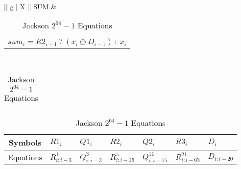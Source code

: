 \begin{table}[H]
\begin{tabularx}{\textwidth}{|| g | X ||}
        SUM   & 
        \begin{tabular}{@{}c@{}}$ sum_i = R2_{i-1}\ ?\ (x_i \oplus D_{i-1})\ :\ x_i$
        \end{tabular}\\\hline
    \end{tabularx}
    

    
    \begin{tabularx}{\textwidth}{X} 
    \\
    \end{tabularx}  
    
    
    \begin{tabularx}{\textwidth}{| c | X X X X X X | } 
        \hline%
        Symbols & $R1_i$ & $Q1_i$ & $R2_i$ & $Q2_i$ & $R3_i$ & $D_i$ \\
        \hline%
        Equations & $R^1_{i:i-3}$ & $Q^3_{i:i-3}$ & $R^5_{i:i-15}$ & $Q^{11}_{i:i-15}$ 
        & $R^{21}_{i:i-63}$ & $ D_{i:i-20}$ \\
        \hline
    \end{tabularx}
    
\caption{Jackson $2^{64}-1$ Equations}
\end{table}


















%




